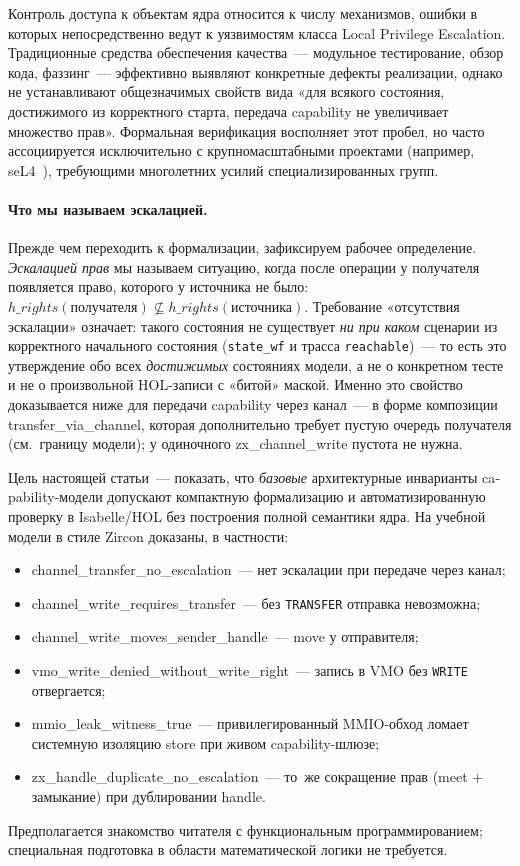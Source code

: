 \documentclass[11pt,a4paper]{article}
\newcommand{\isabel}[1]{{\isabelleit #1}}
\newcommand{\lemmaname}[1]{\isabel{#1}}
\begin{document}
Контроль доступа к объектам ядра относится к числу механизмов, ошибки в
которых непосредственно ведут к уязвимостям класса Local Privilege
Escalation. Традиционные средства обеспечения качества~--- модульное
тестирование, обзор кода, фаззинг~--- эффективно выявляют конкретные
дефекты реализации, однако не устанавливают общезначимых свойств вида
«для всякого состояния, достижимого из корректного старта, передача
\textenglish{capability} не увеличивает множество прав». Формальная верификация восполняет этот пробел, но часто
ассоциируется исключительно с крупномасштабными проектами (например,
seL4~\cite{sel4,sel4overview}), требующими многолетних усилий
специализированных групп.

\paragraph{Что мы называем эскалацией.}
Прежде чем переходить к формализации, зафиксируем рабочее определение.
\emph{Эскалацией прав} мы называем ситуацию, когда после операции у
получателя появляется право, которого у источника не было:
$h\_rights(\text{получателя}) \not\subseteq h\_rights(\text{источника})$.
Требование «отсутствия эскалации» означает: такого состояния не существует
\emph{ни при каком} сценарии из корректного начального состояния
(\texttt{state\_wf} и трасса \texttt{reachable})~--- то
есть это утверждение обо всех \emph{достижимых} состояниях модели, а не о
конкретном тесте и не о произвольной HOL-записи с «битой» маской.
Именно это свойство доказывается ниже для передачи
\textenglish{capability} через канал~--- в форме композиции
\lemmaname{transfer\_via\_channel}, которая дополнительно требует
пустую очередь получателя (см.\ границу модели); у одиночного
\lemmaname{zx\_channel\_write} пустота не нужна.

Цель настоящей статьи~--- показать, что \emph{базовые} архитектурные
инварианты \textenglish{capability}-модели допускают компактную формализацию и
автоматизированную проверку в Isabelle/HOL без построения полной
семантики ядра. На учебной модели в стиле Zircon доказаны, в частности:
\begin{itemize}[leftmargin=1.4em]
	\item \lemmaname{channel\_transfer\_no\_escalation}~--- нет эскалации при
	      передаче через канал;
	\item \lemmaname{channel\_write\_requires\_transfer}~--- без
	      \texttt{TRANSFER} отправка невозможна;
	\item \lemmaname{channel\_write\_moves\_sender\_handle}~--- move у
	      отправителя;
	\item \lemmaname{vmo\_write\_denied\_without\_write\_right}~--- запись в
	      VMO без \texttt{WRITE} отвергается;
	\item \lemmaname{mmio\_leak\_witness\_true}~--- привилегированный MMIO-обход
	      ломает системную изоляцию store при живом capability-шлюзе;
	\item \lemmaname{zx\_handle\_duplicate\_no\_escalation}~--- то~же
	      сокращение прав (meet + замыкание) при дублировании handle.
\end{itemize}
Предполагается знакомство читателя с функциональным программированием;
специальная подготовка в области математической логики не требуется.
\end{document}
